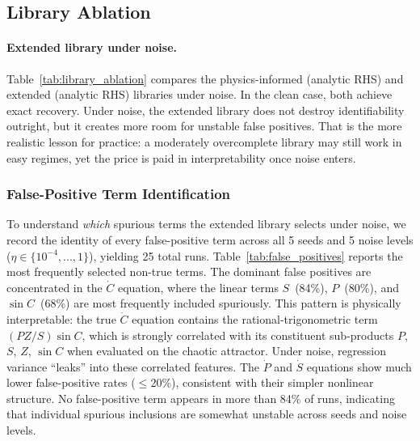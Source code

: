 \documentclass[12pt]{article}
\begin{document}
\subsection{Library Ablation}

\paragraph{Extended library under noise.}
Table~\ref{tab:library_ablation} compares the physics-informed (analytic RHS) and extended (analytic RHS) libraries under noise.
In the clean case, both achieve exact recovery.
Under noise, the extended library does not destroy identifiability outright, but it creates more room for unstable false positives.
That is the more realistic lesson for practice: a moderately overcomplete library may still work in easy regimes, yet the price is paid in interpretability once noise enters.

\subsubsection{False-Positive Term Identification}
\label{sec:false_positives}

To understand \emph{which} spurious terms the extended library selects under noise, we record the identity of every false-positive term across all 5 seeds and 5 noise levels ($\eta\in\{10^{-4},...,1\}$), yielding 25 total runs.
Table~\ref{tab:false_positives} reports the most frequently selected non-true terms.
The dominant false positives are concentrated in the $\dot{C}$ equation, where the linear terms $S$~(84\%), $P$~(80\%), and $\sin C$~(68\%) are most frequently included spuriously.
This pattern is physically interpretable: the true $\dot{C}$ equation contains the rational-trigonometric term $(PZ/S)\sin C$, which is strongly correlated with its constituent sub-products $P$, $S$, $Z$, $\sin C$ when evaluated on the chaotic attractor.
Under noise, regression variance ``leaks'' into these correlated features.
The $\dot{P}$ and $\dot{S}$ equations show much lower false-positive rates ($\leq$20\%), consistent with their simpler nonlinear structure.
No false-positive term appears in more than 84\% of runs, indicating that individual spurious inclusions are somewhat unstable across seeds and noise levels.
\end{document}
